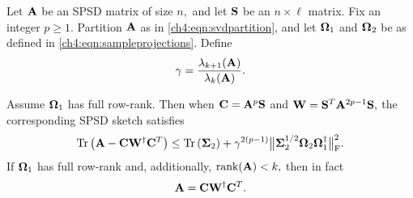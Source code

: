 \begin{thm}
Let $\mathbf{A}$ be an SPSD matrix of size $n,$ and let $\mathbf{S}$ be an $n \times
\ell$ matrix. Fix an integer $p \geq 1.$ Partition $\mathbf{A}$ as in \eqref{ch4:eqn:svdpartition}, and let 
 $\mathbf{\Omega}_1$ and $\mathbf{\Omega}_2$ be as defined in 
\eqref{ch4:eqn:sampleprojections}. Define
\[
 \gamma = \frac{\lambda_{k+1}(\mathbf{A})}{\lambda_k(\mathbf{A})}.
\]

Assume $\mathbf{\Omega}_1$ has full row-rank. Then when $\mathbf{C} = \mathbf{A}^p \mathbf{S}$ and
$\mathbf{W} = \mathbf{S}^T \mathbf{A}^{2p-1} \mathbf{S},$ the corresponding SPSD sketch satisfies 
\begin{align*}
 \operatorname{Tr}\left(\mathbf{A} - \mathbf{C} \mathbf{W}^\dagger \mathbf{C}^T\right) \leq \operatorname{Tr}\left(\mathbf{\Sigma}_2\right) + \gamma^{2(p-1)}\big\|\mathbf{\Sigma}_2^{1/2} \mathbf{\Omega}_2 \mathbf{\Omega}_1^\dagger\big\|_{\mathrm{F}}^2.
\end{align*}
If $\mathbf{\Omega}_1$ has full row-rank and, additionally, $\mathrm{rank}(\mathbf{A}) < k,$ then in fact
\[
 \mathbf{A} = \mathbf{C}\mathbf{W}^\dagger \mathbf{C}^T.
\]
\label{ch4:thm:trace-deterministic-error}
\end{thm}
